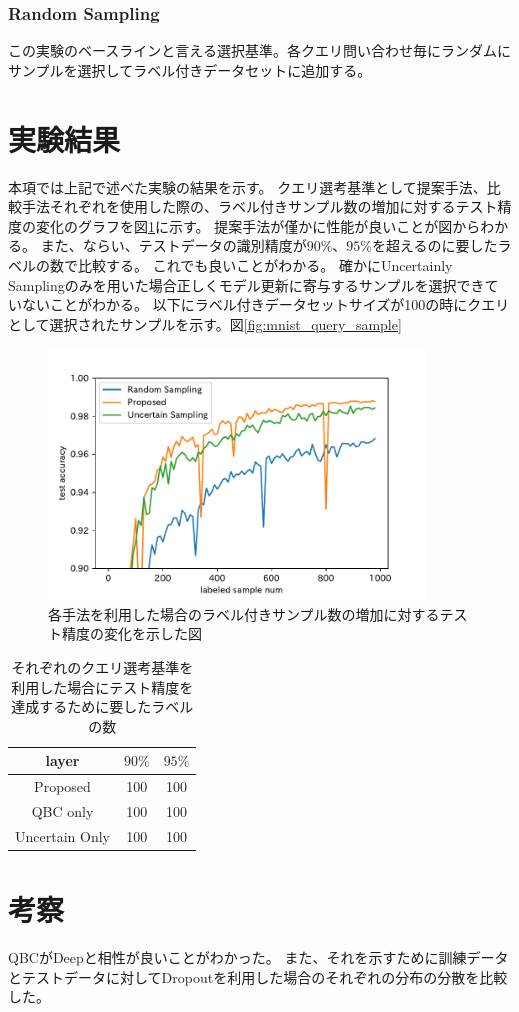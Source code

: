 \subsubsection{Random Sampling}
この実験のベースラインと言える選択基準。各クエリ問い合わせ毎にランダムにサンプルを選択してラベル付きデータセットに追加する。

\section{実験結果}
本項では上記で述べた実験の結果を示す。
クエリ選考基準として提案手法、比較手法それぞれを使用した際の、ラベル付きサンプル数の増加に対するテスト精度の変化のグラフを図\ref{fig:mnist_acc_graph}に示す。
提案手法が僅かに性能が良いことが図からわかる。
また、ならい、テストデータの識別精度が$90\%$、$95\%$を超えるのに要したラベルの数で比較する。
これでも良いことがわかる。
確かにUncertainly Samplingのみを用いた場合正しくモデル更新に寄与するサンプルを選択できていないことがわかる。
以下にラベル付きデータセットサイズが100の時にクエリとして選択されたサンプルを示す。図\ref{fig:mnist_query_sample}

\begin{figure}[tbp]
    \label{fig:mnist_acc_graph}
     \begin{center}
      \includegraphics[width=10cm]{figures/mnist_acc_graph.pdf}
     \end{center}
    \caption{各手法を利用した場合のラベル付きサンプル数の増加に対するテスト精度の変化を示した図}
\end{figure}

\begin{table}[b]
    \label{table:mnist_samplenum_to_ccuracy}
    \caption{それぞれのクエリ選考基準を利用した場合にテスト精度を達成するために要したラベルの数}
    \center
    \begin{tabular}{c|c|c} 
        layer & $90\%$ & $95\%$ \\ \hline
        Proposed & 100 & 100 \\
        QBC only & 100 & 100 \\
        Uncertain Only & 100 & 100 \\
    \end{tabular}
\end{table}

\section{考察}
QBCがDeepと相性が良いことがわかった。
また、それを示すために訓練データとテストデータに対してDropoutを利用した場合のそれぞれの分布の分散を比較した。
